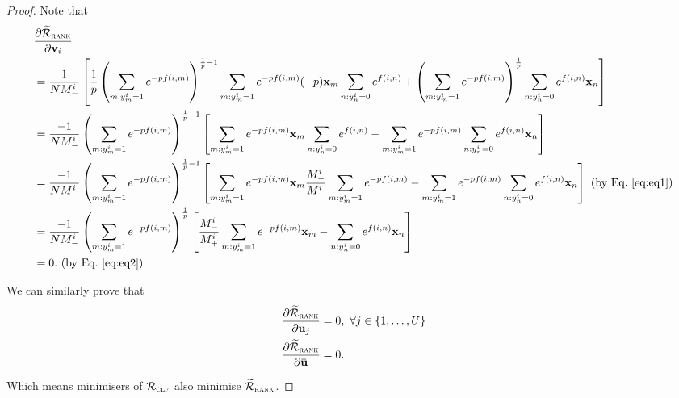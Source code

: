 \begin{proof}
Note that
\begin{equation*}
\begin{aligned}
&\frac{\partial \widetilde{\mathcal{R}}_\textsc{rank}} {\partial \mathbf{v}_i} \\
&= \frac{1}{N M_-^i} \left[ \frac{1}{p} 
   \left( \sum_{m: y_m^i=1} e^{-p f(i, m)} \right)^{\frac{1}{p} - 1} \sum_{m: y_m^i=1} e^{-p f(i, m)} (-p) \mathbf{x}_m \sum_{n: y_n^i=0} e^{f(i, n)}
   + \left( \sum_{m: y_m^i = 1} e^{-p f(i, m)} \right)^\frac{1}{p} \sum_{n: y_n^i = 0} e^{f(i, n)} \mathbf{x}_n \right] \\
&= \frac{-1}{N M_-^i} \left( \sum_{m: y_m^i=1} e^{-p f(i, m)} \right)^{\frac{1}{p} - 1} 
   \left[ \sum_{m: y_m^i=1} e^{-p f(i, m)} \mathbf{x}_m \sum_{n: y_n^i=0} e^{f(i, n)}
   - \sum_{m: y_m^i = 1} e^{-p f(i, m)} \sum_{n: y_n^i = 0} e^{f(i, n)} \mathbf{x}_n \right] \\
&= \frac{-1}{N M_-^i} \left( \sum_{m: y_m^i=1} e^{-p f(i, m)} \right)^{\frac{1}{p} - 1} 
   \left[ \sum_{m: y_m^i=1} e^{-p f(i, m)} \mathbf{x}_m \frac{M_-^i}{M_+^i} \sum_{m: y_m^i=1} e^{-p f(i, m)}
   - \sum_{m: y_m^i = 1} e^{-p f(i, m)} \sum_{n: y_n^i = 0} e^{f(i, n)} \mathbf{x}_n \right] \ \text{(by Eq.~\ref{eq:eq1})} \\
&= \frac{-1}{N M_-^i} \left( \sum_{m: y_m^i=1} e^{-p f(i, m)} \right)^\frac{1}{p} 
   \left[ \frac{M_-^i}{M_+^i} \sum_{m: y_m^i=1} e^{-p f(i, m)} \mathbf{x}_m - \sum_{n: y_n^i = 0} e^{f(i, n)} \mathbf{x}_n \right] \\
&= 0. \ \text{(by Eq.~\ref{eq:eq2})}
\end{aligned}
\end{equation*}

We can similarly prove that 
\begin{equation*}
\begin{aligned}
\frac{\partial \widetilde\RCal_\textsc{rank}}{\partial \bu_j} &= 0, \ \forall j \in \{1,\dots,U\} \\
\frac{\partial \widetilde\RCal_\textsc{rank}}{\partial \widebar{\bu}} &= 0.
\end{aligned}
\end{equation*}

Which means minimisers of $\mathcal{R}_\textsc{clf}$ also minimise $\widetilde{\mathcal{R}}_\textsc{rank}$.

\end{proof}


